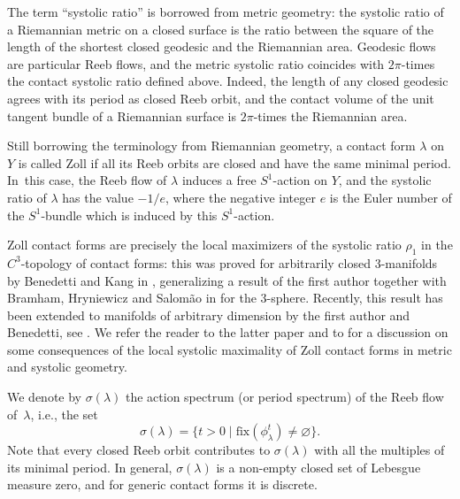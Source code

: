 \documentclass[11pt]{article}
\newcommand{\ie}{i.e.,\xspace}
\numberwithin{equation}{section}
\theoremstyle{definition}
\newcommand{\fix}{\mathrm{fix}}
\let\eul e
\begin{document}
The term ``systolic ratio'' is borrowed from metric geometry: the systolic ratio of a Riemannian metric on a closed surface is the ratio between the square of the length of the shortest closed geodesic and the Riemannian area. Geodesic flows are particular Reeb flows, and the metric systolic ratio coincides with $2\pi$-times the contact systolic ratio defined above. Indeed, the length of any closed geodesic agrees with its period as closed Reeb orbit, and the contact volume of the unit tangent bundle of a Riemannian surface is $2\pi$-times the Riemannian area.

Still borrowing the terminology from Riemannian geometry, a contact form $\lambda$ on~$Y$ is called Zoll if all its Reeb orbits are closed and have the same minimal period. In~this case, the Reeb flow of $\lambda$ induces a free $S^1$-action on $Y$, and the systolic ratio of $\lambda$ has the value $-1/\eul$, where the negative integer $\eul$ is the Euler number of the $S^1$-bundle which is induced by this $S^1$-action.

Zoll contact forms are precisely the local maximizers of the systolic ratio $\rho_1$ in the $C^3$-topology of contact forms: this was proved for arbitrarily closed $3$-manifolds by Benedetti and Kang in \cite{Benedetti:2021aa}, generalizing a result of the first author together with Bramham, Hryniewicz and Salom\~ao in \cite{Abbondandolo:2018fb} for the 3-sphere. Recently, this result has been extended to manifolds of arbitrary dimension by the first author and Benedetti, see \cite{Abbondandolo:2019tl}. We refer the reader to the latter paper and to \cite{Alvarez-Paiva:2014uq} for a discussion on some consequences of the local systolic maximality of Zoll contact forms in metric and systolic geometry.

We denote by $\sigma(\lambda)$ the action spectrum (or period spectrum) of the Reeb flow of~$\lambda$, \ie the set
\[
\sigma(\lambda)=\big\{t>0\mid \fix(\phi_\lambda^t)\neq\varnothing\big\}.
\]
Note that every closed Reeb orbit contributes to $\sigma(\lambda)$ with all the multiples of its minimal period. In general, $\sigma(\lambda)$ is a non-empty closed set of Lebesgue measure zero, and for generic contact forms it is discrete.
\end{document}
